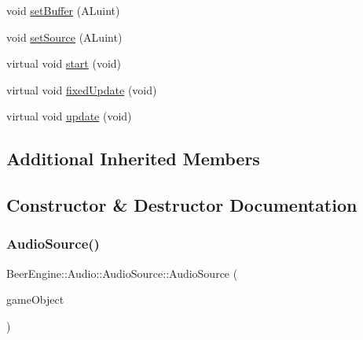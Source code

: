 \begin{DoxyCompactItemize}
void \mbox{\hyperlink{class_beer_engine_1_1_audio_1_1_audio_source_a4e8bd4f802eed9ee3cca487ec01e584e}{set\+Buffer}} (A\+Luint)
\item 
void \mbox{\hyperlink{class_beer_engine_1_1_audio_1_1_audio_source_a37789c76130d45e6e6c807e5297e7ee7}{set\+Source}} (A\+Luint)
\item 
virtual void \mbox{\hyperlink{class_beer_engine_1_1_audio_1_1_audio_source_aa50a60f2ff5540c9e4506b0ae001c98e}{start}} (void)
\item 
virtual void \mbox{\hyperlink{class_beer_engine_1_1_audio_1_1_audio_source_a248900a46e559e0e085b2cb98a766cf2}{fixed\+Update}} (void)
\item 
virtual void \mbox{\hyperlink{class_beer_engine_1_1_audio_1_1_audio_source_aaf476320ad96ecb33951f349f5112c54}{update}} (void)
\end{DoxyCompactItemize}
\subsection*{Additional Inherited Members}


\subsection{Constructor \& Destructor Documentation}
\mbox{\label{class_beer_engine_1_1_audio_1_1_audio_source_ae88acb0b42bec17ab0eb10c2b5a29296}} 
\subsubsection{\texorpdfstring{Audio\+Source()}{AudioSource()}}
{\footnotesize\ttfamily Beer\+Engine\+::\+Audio\+::\+Audio\+Source\+::\+Audio\+Source (\begin{DoxyParamCaption}\item[{\mbox{\hyperlink{class_beer_engine_1_1_game_object}{Beer\+Engine\+::\+Game\+Object}} $\ast$}]{game\+Object }\end{DoxyParamCaption})}

\mbox{\label{class_beer_engine_1_1_audio_1_1_audio_source_ab2c171ac2a239051dee8c22da0400683}} 

